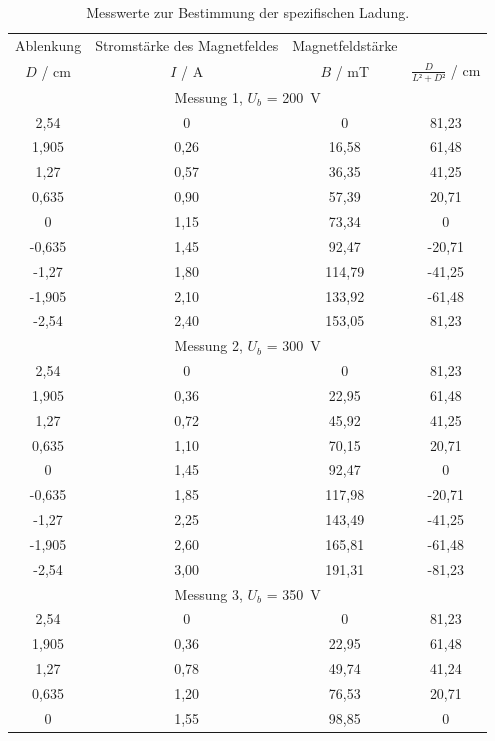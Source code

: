 \begin{table}
  \centering
  \caption{Messwerte zur Bestimmung der spezifischen Ladung.}
  \label{tab:4}
  \begin{tabular}{c c c c}
    \toprule
    Ablenkung & Stromstärke des Magnetfeldes & Magnetfeldstärke & \\
    $D$ / \si{\centi\meter} & $I$ / \si{\ampere} & $B$ / \si{\milli\tesla} & $\frac{D}{L²+D²}$ / \si{\centi\meter} \\
    \midrule
    \multicolumn {4}{c}{Messung 1, $U_b$ = \SI{200}{\volt}} \\
    \midrule
    2,54 & 0 & 0 & 81,23\\
    1,905 & 0,26 & 16,58 & 61,48 \\
    1,27 & 0,57 & 36,35 & 41,25\\
    0,635 & 0,90 & 57,39 & 20,71 \\
    0      & 1,15 & 73,34 & 0 \\
    -0,635 & 1,45 & 92,47 & -20,71 \\
    -1,27  & 1,80 & 114,79 & -41,25 \\
    -1,905 & 2,10 & 133,92 & -61,48 \\
    -2,54  & 2,40 & 153,05 & 81,23 \\
    \midrule
    \multicolumn {4}{c}{Messung 2, $U_b$ = \SI{300}{\volt}} \\
    \midrule
    2,54 & 0 & 0 & 81,23 \\
    1,905 & 0,36 & 22,95 & 61,48 \\
    1,27 & 0,72 & 45,92 & 41,25 \\
    0,635 & 1,10 & 70,15 & 20,71 \\
    0      & 1,45 & 92,47 & 0 \\
    -0,635 & 1,85 & 117,98 & -20,71 \\
    -1,27 & 2,25 & 143,49 & -41,25 \\
    -1,905 & 2,60 & 165,81 & -61,48 \\
    -2,54 & 3,00 & 191,31 & -81,23 \\
    \midrule
    \multicolumn {4}{c}{Messung 3, $U_b$ = \SI{350}{\volt}} \\
    \midrule
    2,54 & 0  & 0 & 81,23 \\
    1,905 & 0,36 & 22,95 & 61,48 \\
    1,27 & 0,78 & 49,74 & 41,24 \\
    0,635 & 1,20  & 76,53 & 20,71 \\
    0      & 1,55 & 98,85 & 0 \\

\end{tabular}
\end{table}
